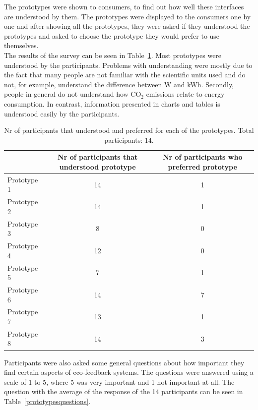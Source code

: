 \documentclass[journal]{vgtc}                %
\begin{document}
The prototypes were shown to consumers, to find out how well these interfaces are understood by them. The prototypes were displayed to the consumers one by one and after showing all the prototypes, they were asked if they understood the prototypes and asked to choose the prototype they would prefer to use themselves.\\

The results of the survey can be seen in Table~\ref{prototypesresults}. Most prototypes were understood by the participants. Problems with understanding were mostly due to the fact that many people are not familiar with the scientific units used and do not, for example, understand the difference between W and kWh. Secondly, people in general do not understand how CO$_2$ emissions relate to energy consumption.
In contrast, information presented in charts and tables is understood easily by the participants.

\begin{table}
  \caption{Nr of participants that understood and preferred for each of the prototypes. Total participants: 14.}
  \label{prototypesresults}
  \scriptsize
  \begin{center}
    \begin{tabular}{|lcc|}
    \hline
       & \multicolumn{1}{p{2.5cm}}{\centering Nr of participants that understood prototype} & 
       \multicolumn{1}{p{3cm}|}{\centering Nr of participants who preferred prototype}  \\ \hline
       Prototype 1 & 14 & 1 \\ 
       Prototype 2 & 14 & 1 \\ 
       Prototype 3 & 8 & 0 \\ 
       Prototype 4 & 12 & 0 \\ 
       Prototype 5 & 7 & 1 \\ 
       Prototype 6 & 14 & 7 \\ 
       Prototype 7 & 13 & 1 \\ 
       Prototype 8 & 14 & 3 \\ \hline
    \end{tabular}
  \end{center}
\end{table}

Participants were also asked some general questions about how important they find certain aspects of eco-feedback systems. The questions were answered using a scale of 1 to 5, where 5 was very important and 1 not important at all. The question with the average of the response of the 14 participants can be seen in Table~\ref{prototypesquestions}.
\end{document}
